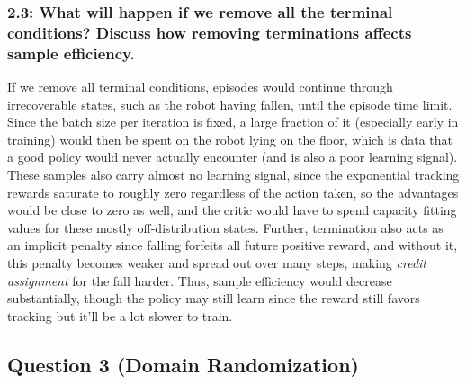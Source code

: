 \documentclass[12pt]{article}
\begin{document}
\subsubsection*{2.3: What will happen if we remove all the terminal conditions? Discuss how removing terminations affects sample efficiency.}
\begin{solution}[height=7cm]
If we remove all terminal conditions, episodes would continue through irrecoverable states, such as the robot having fallen, until the episode time limit. Since the batch size per iteration is fixed, a large fraction of it (especially early in training) would then be spent on the robot lying on the floor, which is data that a good policy would never actually encounter (and is also a poor learning signal). These samples also carry almost no learning signal, since the exponential tracking rewards saturate to roughly zero regardless of the action taken, so the advantages would be close to zero as well, and the critic would have to spend capacity fitting values for these mostly off-distribution states. Further, termination also acts as an implicit penalty since falling forfeits all future positive reward, and without it, this penalty becomes weaker and spread out over many steps, making \emph{credit assignment} for the fall harder. Thus, sample efficiency would decrease substantially, though the policy may still learn since the reward still favors tracking but it'll be a lot slower to train.
\end{solution}

\subsection*{Question 3 (Domain Randomization)}
\end{document}
